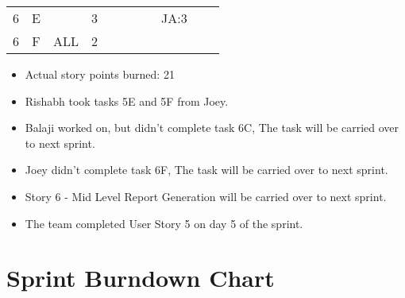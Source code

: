 \documentclass[12pt]{article}
\begin{document}
\begin{table}[H]
\begin{tabular}{@{}c|c|c|c|ccccccc@{}}
6     & E    &            & 3                                                      &                                                 &                                                 &                                                  &                                                  & JA:3                                             &                                                  &                                                  \\ 
6     & F    & ALL        & 2                                                      &                                                 &                                                 &                                                  &                                                  &                                                  &                                                  &                                                  \\ \bottomrule
\end{tabular}
\end{table}

\begin{itemize}%
\item Actual story points burned: 21
\item Rishabh took tasks 5E and 5F from Joey.
\item Balaji worked on, but didn't complete task 6C, The task will be carried over to next sprint.
\item Joey didn't complete task 6F, The task will be carried over to next sprint.
\item Story 6 - Mid Level Report Generation will be carried over to next sprint.
\item The team completed User Story 5 on day 5 of the sprint. 
\end{itemize}

\section{Sprint Burndown Chart}


\newpage


\end{document}

